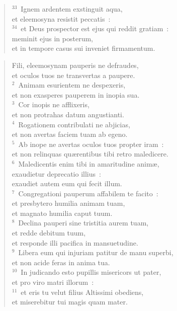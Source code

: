 \begin{flushleft}\begin{verse}${}^{33}$~Ignem ardentem exstinguit aqua,\\ et eleemosyna resistit peccatis~:\\
${}^{34}$~et Deus prospector est ejus qui reddit gratiam~:\\ meminit ejus in posterum,\\ et in tempore casus sui inveniet firmamentum.\end{verse}\end{flushleft}


\begin{flushleft}\begin{verse}\vspace{-19pt}Fili, eleemosynam pauperis ne defraudes,\\ et oculos tuos ne transvertas a paupere.\\
${}^{2}$~Animam esurientem ne despexeris,\\ et non exasperes pauperem in inopia sua.\\
${}^{3}$~Cor inopis ne afflixeris,\\ et non protrahas datum angustianti.\\
${}^{4}$~Rogationem contribulati ne abjicias,\\ et non avertas faciem tuam ab egeno.\\
${}^{5}$~Ab inope ne avertas oculos tuos propter iram~:\\ et non relinquas qu\ae rentibus tibi retro maledicere.\\
${}^{6}$~Maledicentis enim tibi in amaritudine anim\ae ,\\ exaudietur deprecatio illius~:\\ exaudiet autem eum qui fecit illum.\\
${}^{7}$~Congregationi pauperum affabilem te facito~:\\ et presbytero humilia animam tuam,\\ et magnato humilia caput tuum.\\
${}^{8}$~Declina pauperi sine tristitia aurem tuam,\\ et redde debitum tuum,\\ et responde illi pacifica in mansuetudine.\\
${}^{9}$~Libera eum qui injuriam patitur de manu superbi,\\ et non acide feras in anima tua.\\
${}^{10}$~In judicando esto pupillis misericors ut pater,\\ et pro viro matri illorum~:\\
${}^{11}$~et eris tu velut filius Altissimi obediens,\\ et miserebitur tui magis quam mater.\end{verse}\end{flushleft}


